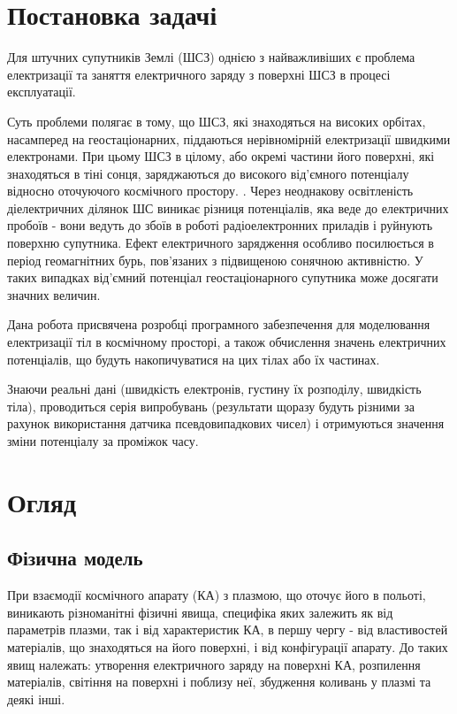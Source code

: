 \documentclass[a4paper,12pt]{article}
\begin{document}
\newpage


\section*{Постановка задачі}
Для штучних супутників Землі (ШСЗ) однією з найважливіших є проблема електризації та заняття електричного заряду з поверхні ШСЗ в процесі експлуатації.

Суть проблеми полягає в тому, що ШСЗ, які знаходяться на високих орбітах, насамперед на геостаціонарних, піддаються  нерівномірній електризації швидкими електронами. При цьому ШСЗ в цілому, або окремі частини його поверхні, які знаходяться в тіні сонця, заряджаються до високого від’ємного потенціалу відносно оточуючого космічного простору. \cite{report1}. Через неоднакову освітленість діелектричних ділянок ШС виникає різниця потенціалів, яка веде до електричних пробоїв - вони ведуть до збоїв в роботі радіоелектронних приладів і руйнують поверхню супутника. Ефект електричного зарядження особливо посилюється в період геомагнітних бурь, пов’язаних з підвищеною сонячною активністю. У таких випадках від’ємний потенціал геостаціонарного супутника може досягати значних величин. \cite{sharp} \cite{deforest}

Дана робота присвячена розробці програмного забезпечення для моделювання електризації тіл в космічному просторі, а також обчислення значень електричних потенціалів, що будуть накопичуватися на цих тілах або їх частинах.

Знаючи реальні дані (швидкість електронів, густину їх розподілу, швидкість тіла), проводиться серія випробувань (результати щоразу будуть різними за рахунок використання датчика псевдовипадкових чисел) і отримуються значення зміни потенціалу за проміжок часу.

\newpage

\section{Огляд}
\subsection{Фізична модель}
При взаємодії космічного апарату (КА) з плазмою, що оточує його в польоті, виникають різноманітні фізичні явища, специфіка яких залежить як від параметрів плазми, так і від характеристик КА, в першу чергу - від властивостей матеріалів, що знаходяться на його поверхні, і від конфігурації апарату. До таких явищ належать: утворення електричного заряду на поверхні КА, розпилення матеріалів, світіння на поверхні і поблизу неї, збудження коливань у плазмі та деякі інші.
\end{document}
